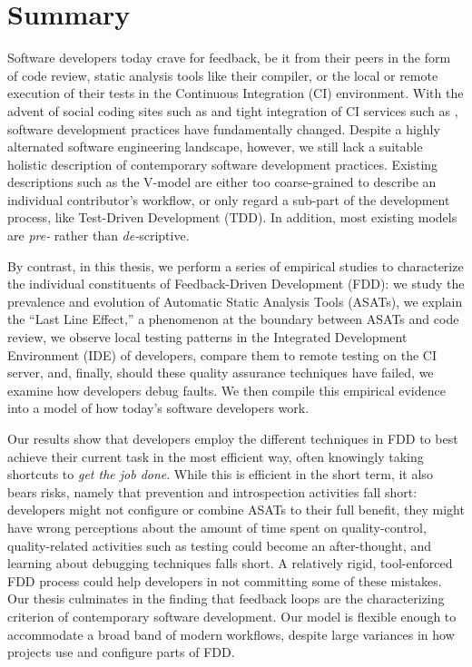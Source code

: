 \chapter*{Summary}

Software developers today crave for feedback, be it from their peers in the form of code review,
static analysis tools like their compiler, or the local or remote execution of their tests in the
Continuous Integration (CI) environment. With the advent of social coding sites such as \github and
tight integration of CI services such as \travis, software development practices have fundamentally
changed.  Despite a highly alternated software engineering landscape, however, we still lack a
suitable holistic description of contemporary software development practices. Existing descriptions
such as the V-model are either too coarse-grained to describe an individual contributor's workflow, or
only regard a sub-part of the development process, like Test-Driven Development (TDD). In addition,
most existing models are \emph{pre-} rather than \emph{de-}scriptive.

By contrast, in this thesis, we perform a series of empirical studies to characterize the
individual constituents of Feedback-Driven Development (FDD): we study the prevalence and evolution
of Automatic Static Analysis Tools (ASATs), we explain the ``Last Line Effect,'' a phenomenon at
the boundary between ASATs and code review, we observe local testing patterns in the Integrated
Development Environment (IDE) of developers, compare them to remote testing on the CI server, and,
finally, should these quality assurance techniques have failed, we examine how developers debug
faults. We then compile this empirical evidence into a model of how today's software
developers work.

Our results show that developers employ the different techniques in FDD to best achieve their
current task in the most efficient way, often knowingly taking shortcuts to \emph{get the job
  done}. While this is efficient in the short term, it also bears risks, namely that prevention and
introspection activities fall short: developers might not configure or combine ASATs to their full
benefit, they might have wrong perceptions about the amount of time spent on quality-control,
quality-related activities such as testing could become an after-thought, and learning about debugging
techniques falls short. A relatively rigid, tool-enforced FDD process could help developers in not
committing some of these mistakes. Our thesis culminates in the finding that feedback loops are
the characterizing criterion of contemporary software development. Our model is flexible enough to
accommodate a broad band of modern workflows, despite large variances in how projects use and
configure parts of FDD.

